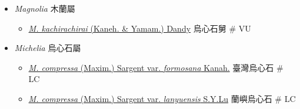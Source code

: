 
  \begin{itemize}
 \item[] \textit{Magnolia} 木蘭屬
                                
  \begin{itemize}
        \item[] \href{http://www.theplantlist.org/tpl1.1/search?q=Magnolia+kachirachirai}{\textit{M. kachirachirai} (Kaneh. \& Yamam.) Dandy}   烏心石舅  \# VU
  \end{itemize}
 \item[] \textit{Michelia} 烏心石屬
                                
  \begin{itemize}
        \item[] \href{http://www.theplantlist.org/tpl1.1/search?q=Michelia+compressa+var.+formosana}{\textit{M. compressa} (Maxim.) Sargent var. \textit{formosana} Kanah.}   臺灣烏心石  \# LC
        \item[] \href{http://www.theplantlist.org/tpl1.1/search?q=Michelia+compressa+var.+lanyuensis}{\textit{M. compressa} (Maxim.) Sargent var. \textit{lanyuensis} S.Y.Lu}   蘭嶼烏心石  \# LC
  \end{itemize}
  \end{itemize}
